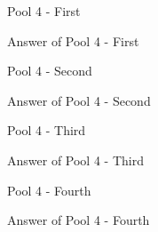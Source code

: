 \begin{question}
Pool 4 - First
\end{question}
\begin{solution}
Answer of Pool 4 - First
\end{solution}

\begin{question}
Pool 4 - Second
\end{question}
\begin{solution}
Answer of Pool 4 - Second
\end{solution}

\begin{question}
Pool 4 - Third
\end{question}
\begin{solution}
Answer of Pool 4 - Third
\end{solution}

\begin{question}
Pool 4 - Fourth
\end{question}
\begin{solution}
Answer of Pool 4 - Fourth
\end{solution}
